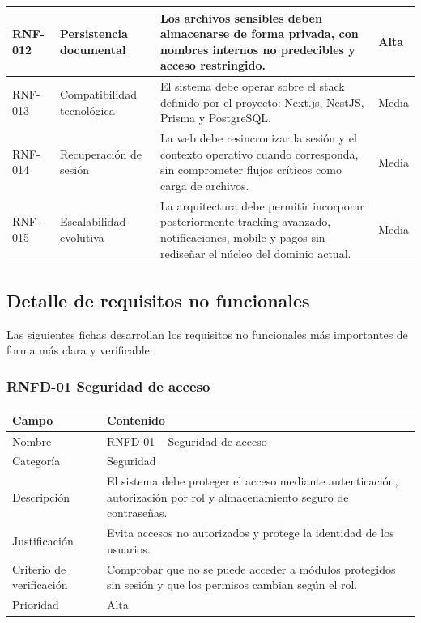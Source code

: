 \documentclass[12pt]{article}
\begin{document}
\begin{longtable}{|P{1.9cm}|P{3.9cm}|P{7.1cm}|P{2.1cm}|}
\hline
RNF-012 & Persistencia documental & Los archivos sensibles deben almacenarse de forma privada, con nombres internos no predecibles y acceso restringido. & Alta \\
\hline
RNF-013 & Compatibilidad tecnol\'ogica & El sistema debe operar sobre el stack definido por el proyecto: Next.js, NestJS, Prisma y PostgreSQL. & Media \\
\hline
RNF-014 & Recuperaci\'on de sesi\'on & La web debe resincronizar la sesi\'on y el contexto operativo cuando corresponda, sin comprometer flujos cr\'iticos como carga de archivos. & Media \\
\hline
RNF-015 & Escalabilidad evolutiva & La arquitectura debe permitir incorporar posteriormente tracking avanzado, notificaciones, mobile y pagos sin redise\~nar el n\'ucleo del dominio actual. & Media \\
\hline
\end{longtable}

\subsection{Detalle de requisitos no funcionales}

Las siguientes fichas desarrollan los requisitos no funcionales m\'as importantes de forma m\'as clara y verificable.

\subsubsection{RNFD-01 Seguridad de acceso}

\begin{tabularx}{\textwidth}{|P{3.3cm}|Y|}
\hline
{}
\textbf{Campo} & \textbf{Contenido} \\
\hline
Nombre & RNFD-01 -- Seguridad de acceso \\
\hline
Categor\'ia & Seguridad \\
\hline
Descripci\'on & El sistema debe proteger el acceso mediante autenticaci\'on, autorizaci\'on por rol y almacenamiento seguro de contrase\~nas. \\
\hline
Justificaci\'on & Evita accesos no autorizados y protege la identidad de los usuarios. \\
\hline
Criterio de verificaci\'on & Comprobar que no se puede acceder a m\'odulos protegidos sin sesi\'on y que los permisos cambian seg\'un el rol. \\
\hline
Prioridad & Alta \\
\hline
\end{tabularx}
\end{document}
